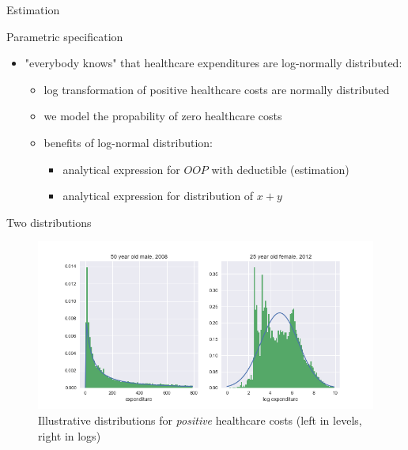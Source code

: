 \documentclass[presentation]{beamer}
\begin{document}
\begin{frame}[label={sec:org025e19e},fragile]{Estimation}
 \begin{block}{Parametric specification}
\begin{itemize}
\item "everybody knows" that healthcare expenditures are log-normally distributed:
\begin{itemize}
\item log transformation of positive healthcare costs are normally distributed
\item we model the propability of zero healthcare costs
\item benefits of log-normal distribution:
\begin{itemize}
\item analytical expression for \(OOP\) with deductible (estimation)
\item analytical expression for distribution of \(x+y\)
\end{itemize}
\end{itemize}
\end{itemize}
\end{block}

\begin{block}{Two distributions}
\begin{figure}[htbp]
\centering
\includegraphics[width=.9\linewidth]{./DistributionExpenditure.png}
\caption{\label{fig:TwoDistributions}
Illustrative distributions for \emph{positive} healthcare costs (left in levels, right in logs)}
\end{figure}
\end{block}


\end{frame}
\end{document}

